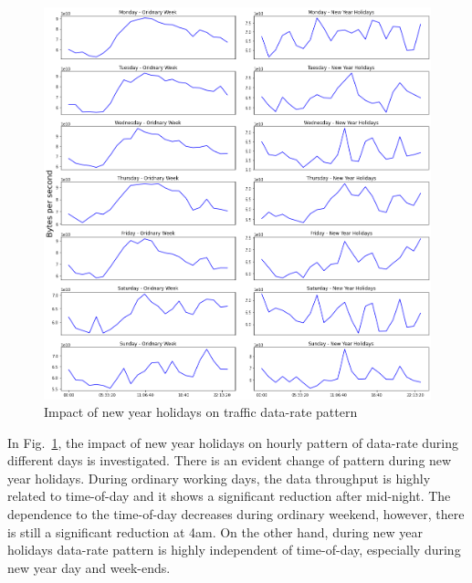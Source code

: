 \documentclass[10pt, journal, letterpaper]{IEEEtran}
\begin{document}
\begin{figure}
    \centering
    \includegraphics[width=\columnwidth]{img/OW_CH2_hourly_compare_bps.png}
    \caption{Impact of new year holidays on traffic data-rate pattern}
    \label{fig:OW_CH2_hourly_bps}
\end{figure}
In Fig.~\ref{fig:OW_CH2_hourly_bps}, the impact of new year holidays on hourly pattern of data-rate during different days is investigated. There is an evident change of pattern during new year holidays. During ordinary working days, the data throughput is highly related to time-of-day and it shows a significant reduction after mid-night. The dependence to the time-of-day decreases during ordinary weekend, however, there is still a significant reduction at 4am. On the other hand, during new year holidays data-rate pattern is highly independent of time-of-day, especially during new year day and week-ends.
\end{document}
